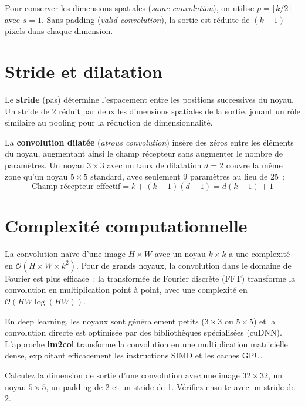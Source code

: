 \documentclass[a4paper,11pt,twoside]{book}
\begin{document}
Pour conserver les dimensions spatiales (\textit{same convolution}), on utilise $p = \lfloor k/2 \rfloor$ avec $s = 1$. Sans padding (\textit{valid convolution}), la sortie est réduite de $(k-1)$ pixels dans chaque dimension.

\section{Stride et dilatation}

Le \textbf{stride} (pas) détermine l'espacement entre les positions successives du noyau. Un stride de 2 réduit par deux les dimensions spatiales de la sortie, jouant un rôle similaire au pooling pour la réduction de dimensionnalité.

La \textbf{convolution dilatée} (\textit{atrous convolution}) insère des zéros entre les éléments du noyau, augmentant ainsi le champ récepteur sans augmenter le nombre de paramètres. Un noyau $3 \times 3$ avec un taux de dilatation $d = 2$ couvre la même zone qu'un noyau $5 \times 5$ standard, avec seulement 9 paramètres au lieu de 25~:
\[
\text{Champ récepteur effectif} = k + (k-1)(d-1) = d(k-1) + 1
\]

\section{Complexité computationnelle}

La convolution naïve d'une image $H \times W$ avec un noyau $k \times k$ a une complexité en $\mathcal{O}(H \times W \times k^2)$. Pour de grands noyaux, la convolution dans le domaine de Fourier est plus efficace~: la transformée de Fourier discrète (FFT) transforme la convolution en multiplication point à point, avec une complexité en $\mathcal{O}(HW \log(HW))$.

En deep learning, les noyaux sont généralement petits ($3 \times 3$ ou $5 \times 5$) et la convolution directe est optimisée par des bibliothèques spécialisées (cuDNN). L'approche \textbf{im2col} transforme la convolution en une multiplication matricielle dense, exploitant efficacement les instructions SIMD et les caches GPU.

\begin{exobox}[Exercice]
Calculez la dimension de sortie d'une convolution avec une image $32 \times 32$, un noyau $5 \times 5$, un padding de 2 et un stride de 1. Vérifiez ensuite avec un stride de 2.
\end{exobox}


\end{document}
